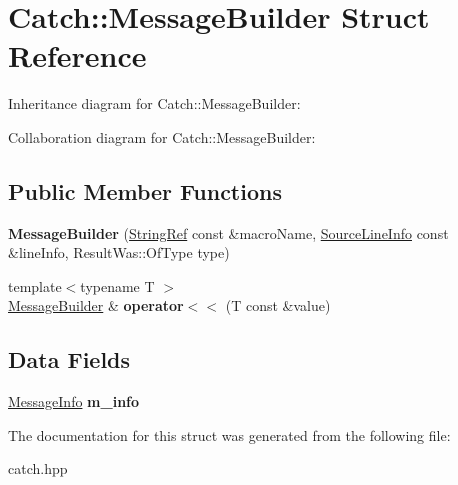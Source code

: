 \hypertarget{structCatch_1_1MessageBuilder}{}\section{Catch\+:\+:Message\+Builder Struct Reference}
\label{structCatch_1_1MessageBuilder}


Inheritance diagram for Catch\+:\+:Message\+Builder\+:


Collaboration diagram for Catch\+:\+:Message\+Builder\+:
\subsection*{Public Member Functions}
\begin{DoxyCompactItemize}
\item 
\mbox{\label{structCatch_1_1MessageBuilder_ac34832ca527a758f000ac233d32dd068}} 
{\bfseries Message\+Builder} (\hyperlink{classCatch_1_1StringRef}{String\+Ref} const \&macro\+Name, \hyperlink{structCatch_1_1SourceLineInfo}{Source\+Line\+Info} const \&line\+Info, Result\+Was\+::\+Of\+Type type)
\item 
\mbox{\label{structCatch_1_1MessageBuilder_a20fa48d069b20dddcc2d3df8abb123c1}} 
{\footnotesize template$<$typename T $>$ }\\\hyperlink{structCatch_1_1MessageBuilder}{Message\+Builder} \& {\bfseries operator$<$$<$} (T const \&value)
\end{DoxyCompactItemize}
\subsection*{Data Fields}
\begin{DoxyCompactItemize}
\item 
\mbox{\label{structCatch_1_1MessageBuilder_a979f1c2b36d78f80ee275bfa5ba0209f}} 
\hyperlink{structCatch_1_1MessageInfo}{Message\+Info} {\bfseries m\+\_\+info}
\end{DoxyCompactItemize}


The documentation for this struct was generated from the following file\+:\begin{DoxyCompactItemize}
\item 
catch.\+hpp\end{DoxyCompactItemize}
